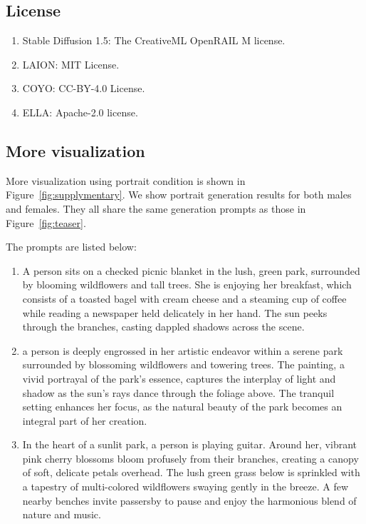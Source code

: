 \subsection{License}\label{sec:license}
\begin{enumerate}
    \item Stable Diffusion 1.5:  The CreativeML OpenRAIL M license.
    \item LAION: MIT License.
    \item COYO: CC-BY-4.0 License. 
    \item ELLA: Apache-2.0 license.
\end{enumerate}

\subsection{More visualization}

More visualization using portrait condition is shown in Figure~\ref{fig:supplymentary}. We show portrait generation results for both males and females. They all share the same generation prompts as those in Figure~\ref{fig:teaser}.

The prompts are listed below:
\begin{enumerate}
    \item A person sits on a checked picnic blanket in the lush, green park, surrounded by blooming wildflowers and tall trees. She is enjoying her breakfast, which consists of a toasted bagel with cream cheese and a steaming cup of coffee while reading a newspaper held delicately in her hand. The sun peeks through the branches, casting dappled shadows across the scene.
    \item a person is deeply engrossed in her artistic endeavor within a serene park surrounded by blossoming wildflowers and towering trees. The painting, a vivid portrayal of the park's essence, captures the interplay of light and shadow as the sun's rays dance through the foliage above. The tranquil setting enhances her focus, as the natural beauty of the park becomes an integral part of her creation.
    \item In the heart of a sunlit park, a person is playing guitar. Around her, vibrant pink cherry blossoms bloom profusely from their branches, creating a canopy of soft, delicate petals overhead. The lush green grass below is sprinkled with a tapestry of multi-colored wildflowers swaying gently in the breeze. A few nearby benches invite passersby to pause and enjoy the harmonious blend of nature and music. 
\end{enumerate}

